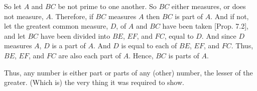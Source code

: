 \begin{Parallel}{}{}
{\epsfysize=2in
\centerline{}

So let  $A$ and $BC$  be not prime to one another. So $BC$ either measures, or
does not measure, $A$. Therefore, if $BC$ measures $A$ then $BC$ is part of
$A$. And if not, let the greatest common measure, $D$, of $A$ and
$BC$ have been taken [Prop. 7.2], and
let $BC$ have been divided into $BE$, $EF$, and $FC$, equal to $D$. And since
$D$ measures $A$, $D$ is a part of $A$. And $D$ is equal to each of $BE$, $EF$, and
$FC$. Thus, $BE$, $EF$, and $FC$ are also each part of $A$. Hence, $BC$ is parts of $A$.

Thus, any number is either part or parts of any (other) number, the
lesser of the greater. (Which is) the very thing it was required to show.}
\end{Parallel}

